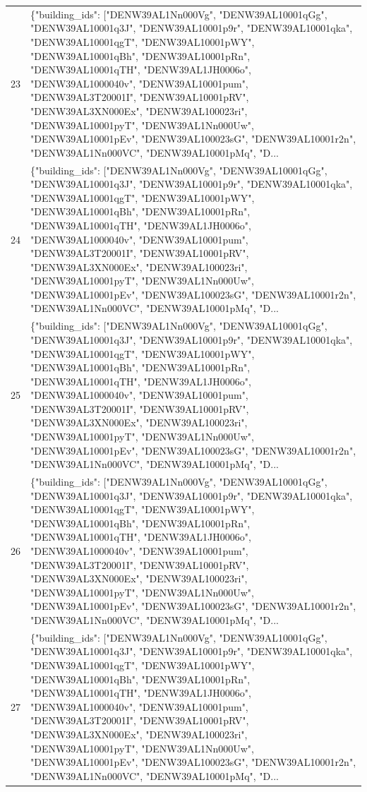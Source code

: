 \documentclass[a4paper,11pt]{article}
\begin{document}
\begin{table}[ht]
\begin{tabular}{r p{12cm}}
23 & \{"building\_ids": ["DENW39AL1Nn000Vg", "DENW39AL10001qGg", "DENW39AL10001q3J", "DENW39AL10001p9r", "DENW39AL10001qka", "DENW39AL10001qgT", "DENW39AL10001pWY", "DENW39AL10001qBh", "DENW39AL10001pRn", "DENW39AL10001qTH", "DENW39AL1JH0006o", "DENW39AL1000040v", "DENW39AL10001pum", "DENW39AL3T20001I", "DENW39AL10001pRV", "DENW39AL3XN000Ex", "DENW39AL100023ri", "DENW39AL10001pyT", "DENW39AL1Nn000Uw", "DENW39AL10001pEv", "DENW39AL100023sG", "DENW39AL10001r2n", "DENW39AL1Nn000VC", "DENW39AL10001pMq", "D... \\
24 & \{"building\_ids": ["DENW39AL1Nn000Vg", "DENW39AL10001qGg", "DENW39AL10001q3J", "DENW39AL10001p9r", "DENW39AL10001qka", "DENW39AL10001qgT", "DENW39AL10001pWY", "DENW39AL10001qBh", "DENW39AL10001pRn", "DENW39AL10001qTH", "DENW39AL1JH0006o", "DENW39AL1000040v", "DENW39AL10001pum", "DENW39AL3T20001I", "DENW39AL10001pRV", "DENW39AL3XN000Ex", "DENW39AL100023ri", "DENW39AL10001pyT", "DENW39AL1Nn000Uw", "DENW39AL10001pEv", "DENW39AL100023sG", "DENW39AL10001r2n", "DENW39AL1Nn000VC", "DENW39AL10001pMq", "D... \\
25 & \{"building\_ids": ["DENW39AL1Nn000Vg", "DENW39AL10001qGg", "DENW39AL10001q3J", "DENW39AL10001p9r", "DENW39AL10001qka", "DENW39AL10001qgT", "DENW39AL10001pWY", "DENW39AL10001qBh", "DENW39AL10001pRn", "DENW39AL10001qTH", "DENW39AL1JH0006o", "DENW39AL1000040v", "DENW39AL10001pum", "DENW39AL3T20001I", "DENW39AL10001pRV", "DENW39AL3XN000Ex", "DENW39AL100023ri", "DENW39AL10001pyT", "DENW39AL1Nn000Uw", "DENW39AL10001pEv", "DENW39AL100023sG", "DENW39AL10001r2n", "DENW39AL1Nn000VC", "DENW39AL10001pMq", "D... \\
26 & \{"building\_ids": ["DENW39AL1Nn000Vg", "DENW39AL10001qGg", "DENW39AL10001q3J", "DENW39AL10001p9r", "DENW39AL10001qka", "DENW39AL10001qgT", "DENW39AL10001pWY", "DENW39AL10001qBh", "DENW39AL10001pRn", "DENW39AL10001qTH", "DENW39AL1JH0006o", "DENW39AL1000040v", "DENW39AL10001pum", "DENW39AL3T20001I", "DENW39AL10001pRV", "DENW39AL3XN000Ex", "DENW39AL100023ri", "DENW39AL10001pyT", "DENW39AL1Nn000Uw", "DENW39AL10001pEv", "DENW39AL100023sG", "DENW39AL10001r2n", "DENW39AL1Nn000VC", "DENW39AL10001pMq", "D... \\
27 & \{"building\_ids": ["DENW39AL1Nn000Vg", "DENW39AL10001qGg", "DENW39AL10001q3J", "DENW39AL10001p9r", "DENW39AL10001qka", "DENW39AL10001qgT", "DENW39AL10001pWY", "DENW39AL10001qBh", "DENW39AL10001pRn", "DENW39AL10001qTH", "DENW39AL1JH0006o", "DENW39AL1000040v", "DENW39AL10001pum", "DENW39AL3T20001I", "DENW39AL10001pRV", "DENW39AL3XN000Ex", "DENW39AL100023ri", "DENW39AL10001pyT", "DENW39AL1Nn000Uw", "DENW39AL10001pEv", "DENW39AL100023sG", "DENW39AL10001r2n", "DENW39AL1Nn000VC", "DENW39AL10001pMq", "D... \\

\end{tabular}
\end{table}
\end{document}
